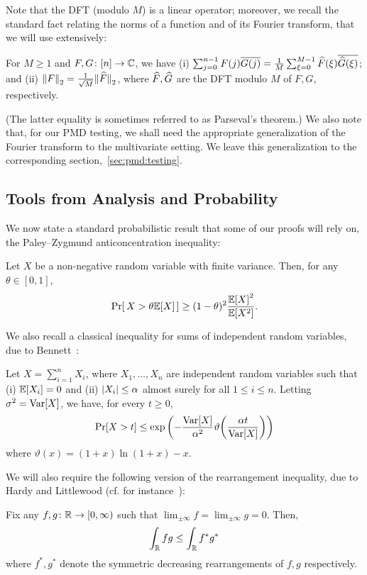 Note that the DFT (modulo $M$) is a linear operator; moreover, we recall the standard fact relating the norms of a function and of its Fourier transform, that we will use extensively:
\begin{theorem}
For $M\geq 1$ and $F,G\colon[n] \to \mathbb{C}$, we have (i) $\sum_{j=0}^{n-1} F(j)\overline{G(j)} =  \frac{1}{M}\sum_{\xi=0}^{M-1} \widehat{F}(\xi)\overline{\widehat{G}(\xi)}$; and (ii) ${\lVert F{\rVert}}_2= \frac{1}{\sqrt{M}}{\lVert\widehat{F}{\rVert}}_2$, 
where $\widehat{F},\widehat{G}$ are the DFT modulo $M$ of $F,G$, respectively.
\end{theorem}
\noindent(The latter equality is sometimes referred to as Parseval's theorem.) We also note that, for our PMD testing, we shall need the appropriate generalization of the Fourier transform to the multivariate setting. We leave this generalization to the corresponding section,~\cref{sec:pmd:testing}.

\subsection{Tools from Analysis and Probability}
We now state a standard probabilistic result that some of our proofs will rely on, the Paley--Zygmund anticoncentration inequality:
\begin{theorem}\label{theo:paley:zigmund}
  Let $X$ be a non-negative random variable with finite variance. Then, for any $\theta\in[0,1]$,
  \[
      \Pr\!\left[\,  X > \theta\mathbb{E}\!\left[X\right] \, \right] \geq (1-\theta)^2\frac{\mathbb{E}\!\left[X\right]^2}{\mathbb{E}\!\left[X^2\right]}.
  \]
\end{theorem}

We also recall a classical inequality for sums of independent random variables, due to Bennett~\cite[Chapter 2]{Boucheron:13}:
\begin{theorem}
Let $X=\sum_{i=1}^n X_i$, where $X_1,\dots,X_n$ are independent random variables such that (i) $\mathbb{E}[X_i]=0$ and (ii) $\left\lvert X_i \right\rvert\leq \alpha$ almost surely for all $1\leq i\leq n$. Letting $\sigma^2=\operatorname{Var}[X]$, we have, for every $t\geq 0$,
\[
    \Pr[ X > t ] \leq \exp\left( -\frac{\operatorname{Var}[X]}{\alpha^2} \vartheta\!\left( \frac{\alpha t}{\operatorname{Var}[X]} \right) \right)
\]
where $\vartheta(x)=(1+x)\ln(1+x) - x$.
\end{theorem}

We will also require the following version of the rearrangement inequality, due to Hardy and Littlewood (cf. for instance~\cite[Theorem 2.2]{BennettS:88}):
  \begin{theorem}\label{theo:hardy:littlewood}
    Fix any $f,g\colon\mathbb{R}\to [0,\infty)$ such that $\lim_{\pm\infty} f = \lim_{\pm\infty} g = 0$. Then,
    \[
        \int_{\mathbb{R}} fg \leq \int_{\mathbb{R}} f^\ast g^\ast
    \]
    where $f^\ast, g^\ast$ denote the symmetric decreasing rearrangements of $f,g$ respectively.
  \end{theorem}


